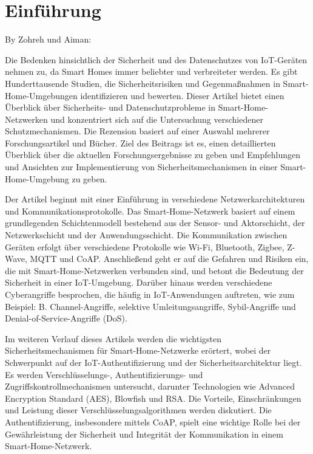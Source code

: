 
\usepackage{enumitem}
\usepackage{cite}
    
\usepackage{natbib}
\newcommand{\dozent}{Dr. Larissa Groth}
\newcommand{\veranstaltung}{IoT Network Security}
\newcommand{\semester}{SoSe23}
\newcommand{\studenten}{Zohreh Asadi, Aiman Al-Hazmi}


\tableofcontents
\newpage

\section{Einführung}

By Zohreh und Aiman:

Die Bedenken hinsichtlich der Sicherheit und des Datenschutzes von IoT-Geräten nehmen zu, da Smart Homes immer beliebter und verbreiteter werden. Es gibt Hunderttausende Studien, die Sicherheitsrisiken und Gegenmaßnahmen in Smart-Home-Umgebungen identifizieren und bewerten. Dieser Artikel bietet einen Überblick über Sicherheits- und Datenschutzprobleme in Smart-Home-Netzwerken und konzentriert sich auf die Untersuchung verschiedener Schutzmechanismen. Die Rezension basiert auf einer Auswahl mehrerer Forschungsartikel und Bücher. Ziel des Beitrags ist es, einen detaillierten Überblick über die aktuellen Forschungsergebnisse zu geben und Empfehlungen und Ansichten zur Implementierung von Sicherheitsmechanismen in einer Smart-Home-Umgebung zu geben. 

Der Artikel beginnt mit einer Einführung in verschiedene Netzwerkarchitekturen und Kommunikationsprotokolle. Das Smart-Home-Netzwerk basiert auf einem grundlegenden Schichtenmodell bestehend aus der Sensor- und Aktorschicht, der Netzwerkschicht und der Anwendungsschicht. Die Kommunikation zwischen Geräten erfolgt über verschiedene Protokolle wie Wi-Fi, Bluetooth, Zigbee, Z-Wave, MQTT und CoAP. Anschließend geht er auf die Gefahren und Risiken ein, die mit Smart-Home-Netzwerken verbunden sind, und betont die Bedeutung der Sicherheit in einer IoT-Umgebung. Darüber hinaus werden verschiedene Cyberangriffe besprochen, die häufig in IoT-Anwendungen auftreten, wie zum Beispiel: B. Channel-Angriffe, selektive Umleitungsangriffe, Sybil-Angriffe und Denial-of-Service-Angriffe (DoS). 

Im weiteren Verlauf dieses Artikels werden die wichtigsten Sicherheitsmechanismen für Smart-Home-Netzwerke erörtert, wobei der Schwerpunkt auf der IoT-Authentifizierung und der Sicherheitsarchitektur liegt. Es werden Verschlüsselungs-, Authentifizierungs- und Zugriffskontrollmechanismen untersucht, darunter Technologien wie Advanced Encryption Standard (AES), Blowfish und RSA. Die Vorteile, Einschränkungen und Leistung dieser Verschlüsselungsalgorithmen werden diskutiert. Die Authentifizierung, insbesondere mittels CoAP, spielt eine wichtige Rolle bei der Gewährleistung der Sicherheit und Integrität der Kommunikation in einem Smart-Home-Netzwerk.


